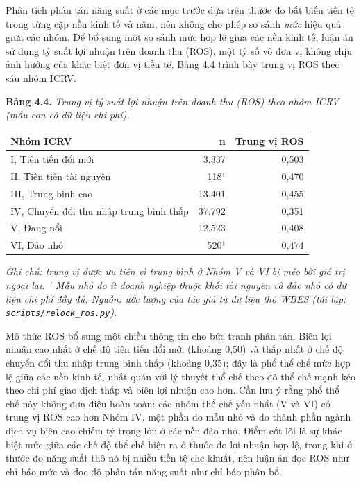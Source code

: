 \documentclass[
  a4paper,
  13pt]{extreport}
\begin{document}
Phân tích phân tán năng suất ở các mục trước dựa trên thước đo bất biến
tiền tệ trong từng cặp nền kinh tế và năm, nên không cho phép so sánh
\emph{mức} hiệu quả giữa các nhóm. Để bổ sung một so sánh mức hợp lệ
giữa các nền kinh tế, luận án sử dụng tỷ suất lợi nhuận trên doanh thu
(ROS), một tỷ số vô đơn vị không chịu ảnh hưởng của khác biệt đơn vị
tiền tệ. Bảng 4.4 trình bày trung vị ROS theo sáu nhóm ICRV.

\textbf{Bảng 4.4.} \emph{Trung vị tỷ suất lợi nhuận trên doanh thu (ROS)
theo nhóm ICRV (mẫu con có dữ liệu chi phí).}

\begin{longtable}[]{@{}lrr@{}}
\toprule\noalign{}
Nhóm ICRV & n & Trung vị ROS \\
\midrule\noalign{}
\endhead
\bottomrule\noalign{}
\endlastfoot
I, Tiên tiến đổi mới & 3.337 & 0,503 \\
II, Tiên tiến tài nguyên & 118¹ & 0,470 \\
III, Trung bình cao & 13.401 & 0,455 \\
IV, Chuyển đổi thu nhập trung bình thấp & 37.792 & 0,351 \\
V, Đang nổi & 12.523 & 0,408 \\
VI, Đảo nhỏ & 520¹ & 0,474 \\
\end{longtable}

\emph{Ghi chú: trung vị được ưu tiên vì trung bình ở Nhóm V và VI bị méo
bởi giá trị ngoại lai. ¹ Mẫu nhỏ do ít doanh nghiệp thuộc khối tài
nguyên và đảo nhỏ có dữ liệu chi phí đầy đủ. Nguồn: ước lượng của tác
giả từ dữ liệu thô WBES (tái lập: \texttt{scripts/relock\_ros.py}).}

Mô thức ROS bổ sung một chiều thông tin cho bức tranh phân tán. Biên lợi
nhuận cao nhất ở chế độ tiên tiến đổi mới (khoảng 0,50) và thấp nhất ở
chế độ chuyển đổi thu nhập trung bình thấp (khoảng 0,35); đây là phổ thể
chế mức hợp lệ giữa các nền kinh tế, nhất quán với lý thuyết thể chế
theo đó thể chế mạnh kéo theo chi phí giao dịch thấp và biên lợi nhuận
cao hơn. Cần lưu ý rằng phổ thể chế này không đơn điệu hoàn toàn: các
nhóm thể chế yếu nhất (V và VI) có trung vị ROS cao hơn Nhóm IV, một
phần do mẫu nhỏ và do thành phần ngành dịch vụ biên cao chiếm tỷ trọng
lớn ở các nền đảo nhỏ. Điểm cốt lõi là sự khác biệt mức giữa các chế độ
thể chế hiện ra ở thước đo lợi nhuận hợp lệ, trong khi ở thước đo năng
suất thô nó bị nhiễu tiền tệ che khuất, nên luận án đọc ROS như chỉ báo
mức và đọc độ phân tán năng suất như chỉ báo phân bổ.
\end{document}
